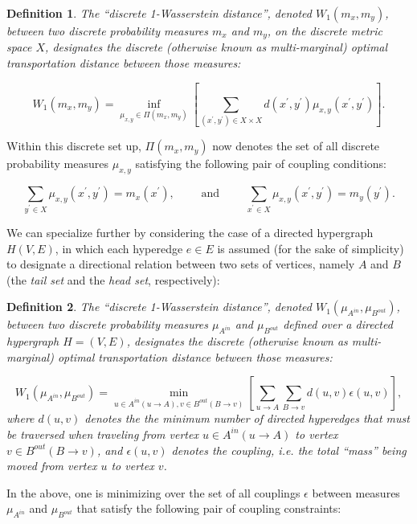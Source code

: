 \documentclass{article}
\newtheorem{definition}{Definition}
\begin{document}
\begin{definition}
The ``discrete 1-Wasserstein distance'', denoted ${W_1 \left( m_x, m_y \right)}$, between two discrete probability measures ${m_x}$ and ${m_y}$, on the discrete metric space $X$, designates the discrete (otherwise known as multi-marginal) optimal transportation distance between those measures:

\begin{equation}
W_1 \left( m_x, m_y \right) = \inf_{\mu_{x, y} \in \Pi \left( m_x, m_y \right)} \left[ \sum_{\left( x^{\prime}, y^{\prime} \right) \in X \times X} d \left( x^{\prime}, y^{\prime} \right) \mu_{x, y} \left( x^{\prime}, y^{\prime} \right) \right].
\end{equation}
\end{definition}
Within this discrete set up, ${\Pi \left( m_x, m_y \right)}$ now denotes the set of all discrete probability measures ${\mu_{x, y}}$ satisfying the following pair of coupling conditions:

\begin{equation}
\sum_{y^{\prime} \in X} \mu_{x, y} \left( x^{\prime}, y^{\prime} \right) = m_x \left( x^{\prime} \right), \qquad \text{ and } \qquad \sum_{x^{\prime} \in X} \mu_{x, y} \left( x^{\prime}, y^{\prime} \right) = m_y \left( y^{\prime} \right).
\end{equation}

We can specialize further by considering the case of a directed hypergraph ${H \left( V, E \right)}$, in which each hyperedge ${e \in E}$ is assumed (for the sake of simplicity) to designate a directional relation between two sets of vertices, namely $A$ and $B$ (the \textit{tail set} and the \textit{head set}, respectively):

\begin{definition}
The ``discrete 1-Wasserstein distance'', denoted ${W_1 \left( \mu_{A^{in}}, \mu_{B^{out}} \right)}$, between two discrete probability measures ${\mu_{A^{in}}}$ and ${\mu_{B^{out}}}$ defined over a directed hypergraph ${H = \left( V, E \right)}$, designates the discrete (otherwise known as multi-marginal) optimal transportation distance between those measures:

\begin{equation}
W_1 \left( \mu_{A^{in}}, \mu_{B^{out}} \right) = \min_{u \in A^{in} \left( u \to A \right), v \in B^{out} \left( B \to v \right)} \left[\sum_{u \to A} \sum_{B \to v} d \left( u, v \right) \epsilon \left( u, v \right) \right],
\end{equation}
where ${d \left( u, v \right)}$ denotes the the minimum number of directed hyperedges that must be traversed when traveling from vertex ${u \in A^{in} \left( u \to A \right)}$ to vertex ${v \in B^{out} \left( B \to v \right)}$, and ${\epsilon \left( u, v \right)}$ denotes the coupling, i.e. the total ``mass'' being moved from vertex $u$ to vertex $v$.
\end{definition}
In the above, one is minimizing over the set of all couplings ${\epsilon}$ between measures ${\mu_{A^{in}}}$ and ${\mu_{B^{out}}}$ that satisfy the following pair of coupling constraints:
\end{document}
